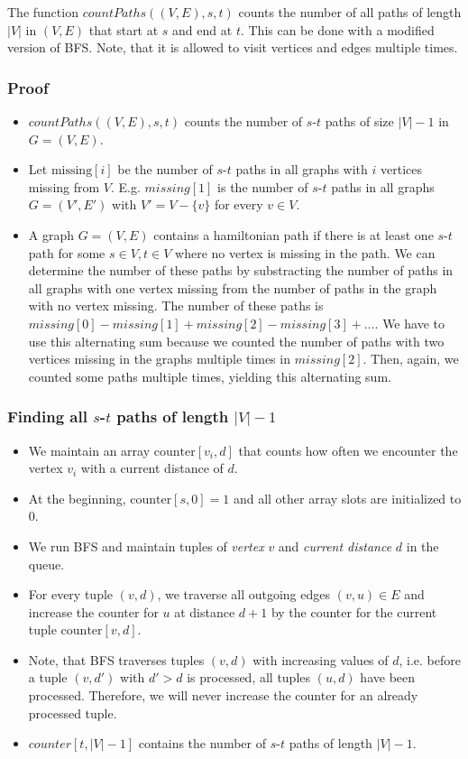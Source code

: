 \documentclass[12pt]{article}
\begin{document}
The function $\mathit{countPaths}((V, E), s, t)$ counts the number of all paths of length $|V|$ in $(V, E)$ that start at $s$ and end at $t$. This can be done with a modified version of BFS. Note, that it is allowed to visit vertices and edges multiple times.

\subsubsection*{Proof}
\begin{itemize}
	\item $\mathit{countPaths}((V,E), s, t)$ counts the number of $s$-$t$ paths of size $|V| - 1$ in $G=(V,E)$.
	\item Let $\mbox{missing}[i]$ be the number of $s$-$t$ paths in all graphs with $i$ vertices missing from $V$. E.g. $\mathit{missing}[1]$ is the number of $s$-$t$ paths in all graphs $G=(V', E')$ with $V'=V-\{v\}$ for every $v \in V$.
	\item A graph $G=(V,E)$ contains a hamiltonian path if there is at least one $s$-$t$ path for some $s \in V, t \in V$ where no vertex is missing in the path. We can determine the number of these paths by substracting the number of paths in all graphs with one vertex missing from the number of paths in the graph with no vertex missing. The number of these paths is $\mathit{missing}[0] - \mathit{missing}[1] + \mathit{missing}[2] - \mathit{missing}[3] + \ldots$. We have to use this alternating sum because we counted the number of paths with two vertices missing in the graphs multiple times in $\mathit{missing}[2]$. Then, again, we counted some paths multiple times, yielding this alternating sum.
\end{itemize}

\subsubsection*{Finding all $s$-$t$ paths of length $|V| - 1$}
\begin{itemize}
	\item We maintain an array $\mbox{counter}[v_i, d]$ that counts how often we encounter the vertex $v_i$ with a current distance of $d$.
	\item At the beginning, $\mbox{counter}[s,0] = 1$ and all other array slots are initialized to $0$.
	\item We run BFS and maintain tuples of \emph{vertex} $v$ and \emph{current distance} $d$ in the queue.
	\item For every tuple $(v,d)$, we traverse all outgoing edges $(v,u) \in E$ and increase the counter for $u$ at distance $d+1$ by the counter for the current tuple $\mbox{counter}[v, d]$.
	\item Note, that BFS traverses tuples $(v, d)$ with increasing values of $d$, i.e. before a tuple $(v, d')$ with $d'> d$ is processed, all tuples $(u, d)$ have been processed. Therefore, we will never increase the counter for an already processed tuple.
	\item $\mathit{counter}[t, |V| - 1]$ contains the number of $s$-$t$ paths of length $|V| - 1$.
\end{itemize}
\end{document}
